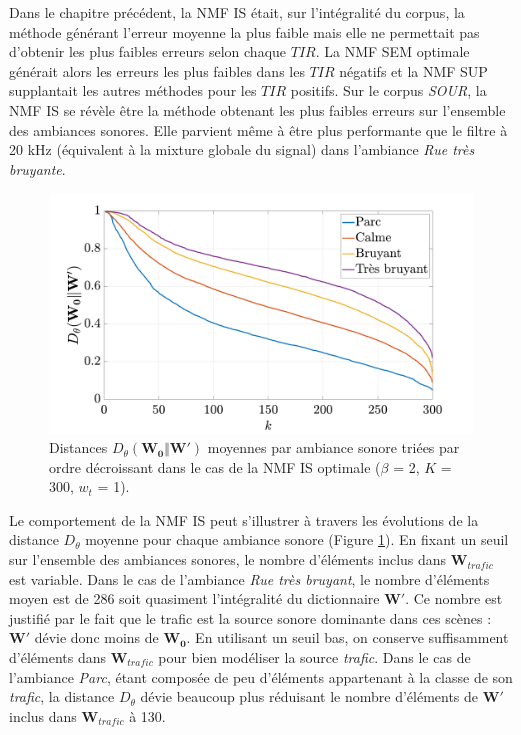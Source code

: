 Dans le chapitre précédent, la NMF IS était, sur l'intégralité du corpus, la méthode générant l'erreur moyenne la plus faible mais elle ne permettait pas d'obtenir les plus faibles erreurs selon chaque $TIR$. La NMF SEM optimale générait alors les erreurs les plus faibles dans les $TIR$ négatifs et la NMF SUP supplantait les autres méthodes pour les $TIR$ positifs. 
Sur le corpus \textit{SOUR}, la NMF IS se révèle être la méthode obtenant les plus faibles erreurs sur l'ensemble des ambiances sonores. Elle parvient même à être plus performante que le filtre à 20 kHz (équivalent à la mixture globale du signal) dans l'ambiance \textit{Rue très bruyante}. 

\begin{figure}[h]
\centering
\includegraphics[width=.7\linewidth]{./figures/resultats/dist_grafic.pdf}
\caption{Distances $D_{\theta}(\mathbf{W_0}\Vert \mathbf{W'})$ moyennes par ambiance sonore triées par ordre décroissant  dans le cas de la NMF IS optimale ($\beta$ = 2, $K$ = 300, $w_t$ = 1).}
\label{fig:dist_grafic}
\end{figure}

Le comportement de la NMF IS peut s'illustrer à travers les évolutions de la distance $D_{\theta}$ moyenne pour chaque ambiance sonore (Figure \ref{fig:dist_grafic}).
En fixant un seuil sur l'ensemble des ambiances sonores, le nombre d'éléments inclus dans $\mathbf{W}_{trafic}$ est variable. 
Dans le cas de l'ambiance \textit{Rue très bruyant}, le nombre d'éléments moyen est de 286 soit quasiment l'intégralité du dictionnaire $\mathbf{W'}$. Ce nombre est justifié par le fait que le trafic est la source sonore dominante dans ces scènes : $\mathbf{W'}$ dévie donc moins de $\mathbf{W_0}$. En utilisant un seuil bas, on conserve suffisamment d'éléments dans $\mathbf{W}_{trafic}$ pour bien modéliser la source \textit{trafic}.
Dans le cas de l'ambiance \textit{Parc}, étant composée de peu d'éléments appartenant à la classe de son \textit{trafic}, la distance $D_{\theta}$ dévie beaucoup plus réduisant le nombre d'éléments de $\mathbf{W'}$ inclus dans $\mathbf{W}_{trafic}$ à 130.

